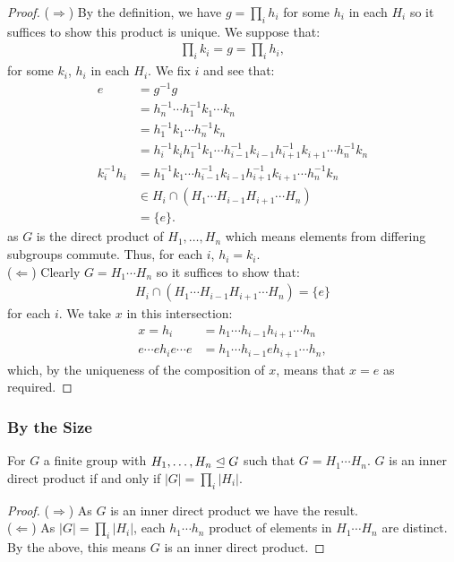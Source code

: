 \begin{proof}
    ($\Rightarrow$)
    By the definition, we have $g = \prod_ih_i$ for some $h_i$
    in each $H_i$ so it suffices to show this product is unique. 
    We suppose that: \begin{align*}
        \prod_i k_i = g = \prod_i h_i,
    \end{align*} for some $k_i$, $h_i$ in each $H_i$.
    We fix $i$ and see that: \begin{align*}
        e &= g^{-1}g \\
        &= h_n^{-1} \cdots h_1^{-1} k_1 \cdots k_n \\
        &= h_1^{-1}k_1 \cdots h_n^{-1}k_n \\
        &= h_i^{-1}k_i h_1^{-1}k_1 \cdots 
            h_{i - 1}^{-1}k_{i - 1} h_{i + 1}^{-1}k_{i + 1} \cdots
            h_n^{-1}k_n \\
        k_i^{-1}h_i &= h_1^{-1}k_1 \cdots 
            h_{i - 1}^{-1}k_{i - 1} h_{i + 1}^{-1}k_{i + 1} \cdots
            h_n^{-1}k_n \\
        &\in H_i \cap (H_1 \cdots H_{i - 1}H_{i + 1} \cdots H_n) \\
        &= \{e\}.
    \end{align*} as $G$ is the direct product of $H_1, \ldots, H_n$
    which means elements from differing subgroups commute. Thus,
    for each $i$, $h_i = k_i$.
    \\[\baselineskip]
    ($\Leftarrow$) Clearly $G = H_1 \cdots H_n$ so it suffices to
    show that: \begin{align*}
        H_i \cap (H_1 \cdots H_{i - 1}H_{i + 1} \cdots H_n) = \{e\}
    \end{align*} for each $i$. We take $x$ in this intersection: \begin{align*}
        x = h_i 
        &= h_1 \cdots h_{i - 1} h_{i + 1} \cdots h_n \\
        e \cdots e h_i e \cdots e 
        &= h_1 \cdots h_{i - 1} e h_{i + 1} \cdots h_n,
    \end{align*} which, by the uniqueness of the composition 
    of $x$, means that $x = e$ as required.
\end{proof} 

\newpage

\subsubsection{By the Size}

For $G$ a finite group with $H_1, \ldots, H_n \trianglelefteq G$ such that
$G = H_1 \cdots H_n$. $G$ is an inner direct product if and only if
$|G| = \prod_i |H_i|$.

\begin{proof}
    ($\Rightarrow$) As $G$ is an inner direct product we have the result.
    \\[\baselineskip]
    ($\Leftarrow$) As $|G| = \prod_i |H_i|$, each $h_1 \cdots h_n$
    product of elements in $H_1 \cdots H_n$ are distinct. By the above,
    this means $G$ is an inner direct product.
\end{proof}
